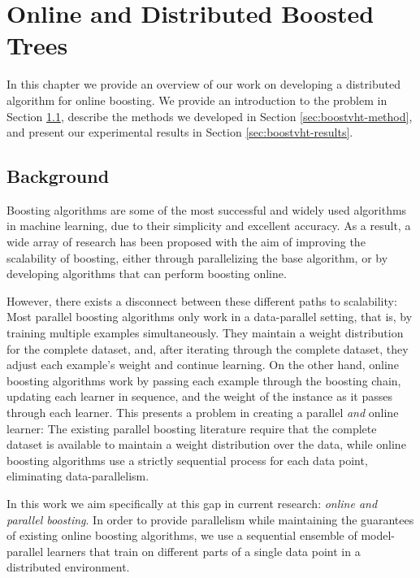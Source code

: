 \chapter{Online and Distributed Boosted Trees}

In this chapter we provide an overview of our work on developing a distributed
algorithm for online boosting. We provide an introduction to the problem
in Section \ref{sec:boostvht-background}, describe the methods we developed
in Section \ref{sec:boostvht-method}, and present our experimental results
in Section \ref{sec:boostvht-results}.

\section{Background}
\label{sec:boostvht-background}

Boosting algorithms are some of the most successful and widely used algorithms
in machine learning, due to their simplicity and excellent accuracy. As a result,
a wide array of research has been proposed with the aim of improving the scalability
of boosting, either through parallelizing the base algorithm, or by developing
algorithms that can perform boosting online.

However, there exists a disconnect
between these different paths to scalability: Most parallel boosting algorithms
only work in a data-parallel setting, that is, by training multiple examples simultaneously.
They maintain a weight distribution for the complete dataset, and, after iterating through the complete dataset, they adjust each example's weight
and continue learning.
On the other hand, online boosting algorithms work by passing each example through
the boosting chain, updating each learner in sequence, and the weight of the instance
as it passes through each learner.
This presents a problem in creating a parallel \textit{and} online learner: The
existing parallel boosting literature require that the complete dataset is available
to maintain a weight distribution over the data, while online boosting algorithms
use a strictly sequential process for each data point, eliminating data-parallelism.

In this work we aim specifically at this gap in current research: \emph{online and parallel
boosting}. In order to provide parallelism while maintaining the guarantees of existing
online boosting algorithms, we use a sequential ensemble of model-parallel learners that train
on different parts of a single data point in a distributed environment.

